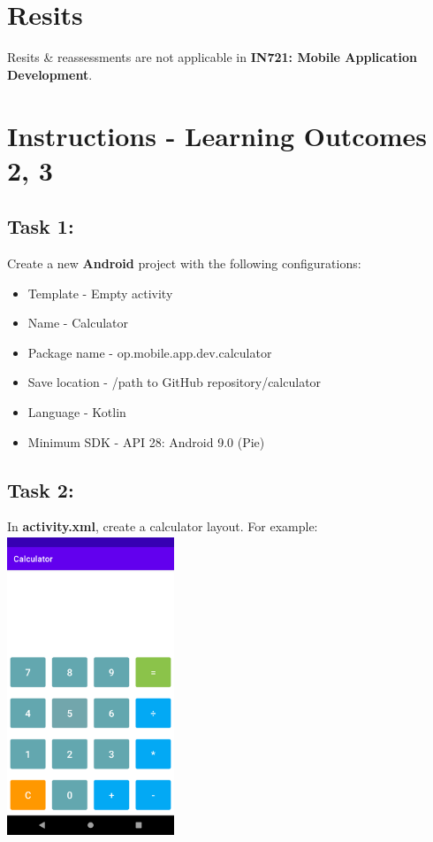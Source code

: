 \documentclass{article}
\begin{document}
\section*{Resits}
Resits \& reassessments are not applicable in \textbf{IN721: Mobile Application Development}.

\section*{Instructions - Learning Outcomes 2, 3}

\subsection*{Task 1:} Create a new \textbf{Android} project with the following configurations:
\begin{itemize}
	\item Template - Empty activity
	\item Name - Calculator
	\item Package name - op.mobile.app.dev.calculator
	\item Save location - /path to GitHub repository/calculator
	\item Language - Kotlin
	\item Minimum SDK - API 28: Android 9.0 (Pie) 
\end{itemize} 

\subsection*{Task 2:} In \textbf{activity.xml}, create a calculator layout. For example: \\

\includegraphics[width=5cm, height=9cm]{../tex/img/02-android-overview/practical/calculator-1.png}  \\
\end{document}
